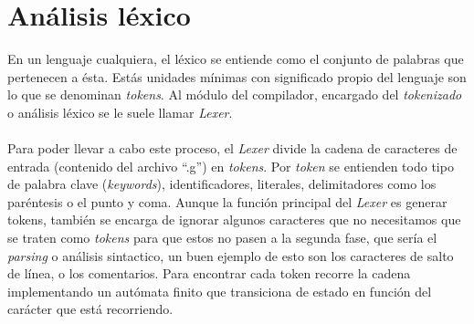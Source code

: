 \section{Análisis léxico}
En un lenguaje cualquiera,  el léxico se entiende como el conjunto de palabras  que pertenecen a ésta.
Estás unidades mínimas con significado propio del lenguaje son lo que se denominan \textit{tokens}.
Al módulo del compilador, encargado del  \textit{tokenizado} o análisis léxico se le suele llamar \textit{Lexer}.\\\\%
Para poder llevar a cabo este proceso, el \textit{Lexer} divide la cadena de caracteres de entrada (contenido del archivo ``.g'') en \textit{tokens}. Por \textit{token} se entienden todo tipo de palabra clave (\textit{keywords}), identificadores, literales, delimitadores como los paréntesis o el punto y coma. Aunque la función principal del \textit{Lexer} es generar tokens, también se encarga de ignorar algunos caracteres que no necesitamos que se traten como \textit{tokens} para que estos no pasen a la segunda fase, que sería el \textit{parsing} o análisis sintactico, un buen ejemplo de esto son los caracteres de salto de línea, o los comentarios. Para encontrar cada token recorre la cadena implementando un autómata finito que transiciona de estado en función del carácter que está recorriendo.\\

